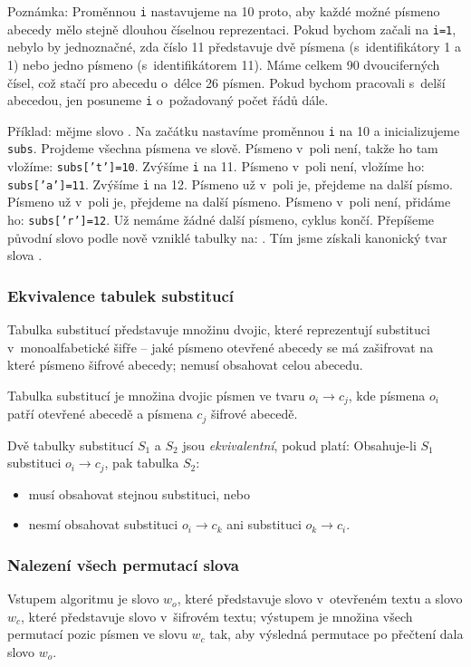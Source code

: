 \documentclass[12pt]{article}
\theoremstyle{definition}
\newcommand{\var}[1]{\texttt{#1}}
\begin{document}
Poznámka: Proměnnou \var{i} nastavujeme na 10 proto, aby každé možné písmeno abecedy mělo stejně dlouhou číselnou reprezentaci. Pokud bychom začali na \var{i=1}, nebylo by jednoznačné, zda číslo 11 představuje dvě písmena (s~identifikátory 1 a 1) nebo jedno písmeno (s~identifikátorem 11). Máme celkem 90 dvouciferných čísel, což stačí pro abecedu o~délce 26 písmen. Pokud bychom pracovali s~delší abecedou, jen posuneme \var{i} o~požadovaný počet řádů dále. 

Příklad: mějme slovo . Na začátku nastavíme proměnnou \var{i} na 10 a inicializujeme \var{subs}. Projdeme všechna písmena ve slově. Písmeno  v~poli není, takže ho tam vložíme: \var{subs['t']=10}. Zvýšíme \var{i} na 11. Písmeno  v~poli není, vložíme ho: \var{subs['a']=11}. Zvýšíme \var{i} na 12. Písmeno  už v~poli je, přejdeme na další písmo. Písmeno  už v~poli je, přejdeme na další písmeno. Písmeno  v~poli není, přidáme ho: \var{subs['r']=12}. Už nemáme žádné další písmeno, cyklus končí. Přepíšeme původní slovo  podle nově vzniklé tabulky na: . Tím jsme získali kanonický tvar slova .

\subsubsection{Ekvivalence tabulek substitucí}
\label{ekvsubs}
Tabulka substitucí představuje množinu dvojic, které reprezentují substituci v~monoalfabetické šifře -- jaké písmeno otevřené abecedy se má zašifrovat na které písmeno šifrové abecedy; nemusí obsahovat celou abecedu. 

Tabulka substitucí je množina dvojic písmen ve tvaru $o_i\rightarrow c_j$, kde písmena $o_i$ patří otevřené abecedě a písmena $c_j$ šifrové abecedě. 

Dvě tabulky substitucí $S_1$ a $S_2$ jsou {\em ekvivalentní}, pokud platí: Obsahuje-li $S_1$ substituci $o_i\rightarrow c_j$, pak tabulka $S_2$:

\begin{itemize}
\item musí obsahovat stejnou substituci, nebo
\item nesmí obsahovat substituci $o_i\rightarrow c_k$ ani substituci $o_k\rightarrow c_i$.
\end{itemize}

\subsubsection{Nalezení všech permutací slova}
\label{wordperms}
Vstupem algoritmu je slovo $w_o$, které představuje slovo v~otevřeném textu a slovo $w_c$, které představuje slovo v~šifrovém textu; výstupem je množina všech permutací pozic písmen ve slovu $w_c$ tak, aby výsledná permutace po přečtení dala slovo $w_o$.
\end{document}
